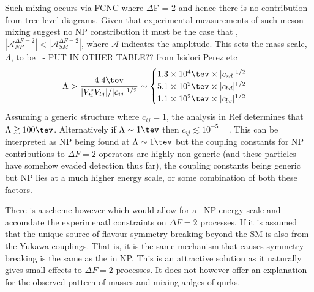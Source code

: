 Such mixing occurs via FCNC where $\Delta$F = 2 and hence there is no contribution from tree-level diagrams. %
Given that experimental measurements of such meson mixing suggest no NP constribution it must be the case that , $|\mathcal{A}_{NP}^{\Delta F = 2}|<|\mathcal{A}_{SM}^{\Delta F = 2}|$, where $\mathcal{A}$ indicates the amplitude. This  sets the mass scale, $\Lambda$, to be~\cite{kaonmix} - PUT IN OTHER TABLE?? from Isidori Perez etc
\begin{equation}
  \Lambda>\frac{4.4\tev}{|V_{ti}^{*}V_{tj}|/|c_{ij}|^{1/2}} \sim
  \begin{cases}
    1.3\times 10^{4}\tev \times |c_{sd}|^{1/2}\\
    5.1\times 10^{2}\tev \times |c_{bd}|^{1/2}\\
    1.1\times 10^{2}\tev \times |c_{bs}|^{1/2}\\
  \end{cases}
\end{equation}
Assuming a generic structure where $c_{ij} = 1$, the analysis in Ref determines that $\Lambda \gtrsim 100\tev$. Alternatively if $\Lambda \sim 1\tev$ then $c_{ij}\lesssim 10^{-5}$ ~\cite{flavourlimit} . This can be interpreted as NP being found at $\Lambda \sim 1\tev$  but the coupling constants for NP contributions to $\Delta F=2$ operators are highly non-generic (and these particles have somehow evaded detection thus far), the coupling constants being generic but NP lies at a much higher energy scale, or some combination of both these factors.

There is a scheme however which would allow for a ~\tev NP energy scale and accomdate the experimenatl constraints on $\Delta F = 2$ processes. If it is assumed that the unique source of flavour symmetry breaking beyond the SM is also from the Yukawa couplings. That is, it is the same mechanism that causes symmetry-breaking is the same as the in NP. This is an attractive solution as it naturally gives small effects to $\Delta F = 2$ processes. It does not however offer an explanation for the observed pattern of masses and mixing anlges of qurks.%
